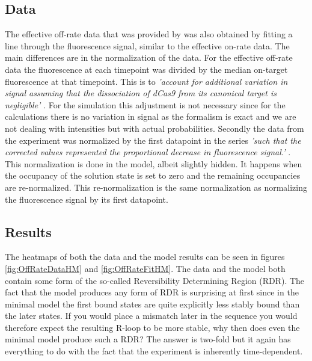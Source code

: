 \subsection{Data}
The effective off-rate data that was provided by \cite{PNAS} was also obtained by fitting a line through the fluorescence signal, similar to the effective on-rate data. The main differences are in the normalization of the data. For the effective off-rate data the fluorescence at each timepoint was divided by the median on-target fluorescence at that timepoint. This is to \textit{'account for additional variation in signal assuming that the dissociation of dCas9 from its canonical target is negligible'} \citep{PNAS}. For the simulation this adjustment is not necessary since for the calculations there is no variation in signal as the formalism is exact and we are not dealing with intensities but with actual probabilities. Secondly the data from the experiment was normalized by the first datapoint in the series \textit{'such that the corrected values represented the proportional decrease in fluorescence signal.'} \citep{PNAS}. This normalization is done in the model, albeit slightly hidden. It happens when the occupancy of the solution state is set to zero and the remaining occupancies are re-normalized. This re-normalization is the same normalization as normalizing the fluorescence signal by its first datapoint.


\subsection{Results}

The heatmaps of both the data and the model results can be seen in figures \ref{fig:OffRateDataHM} and \ref{fig:OffRateFitHM}. The data and the model both contain some form of the so-called Reversibility Determining Region (RDR). The fact that the model produces any form of RDR is surprising at first since in the minimal model the first bound states are quite explicitly less stably bound than the later states. If you would place a mismatch later in the sequence you would therefore expect the resulting R-loop to be more stable, why then does even the minimal model produce such a RDR? The answer is two-fold but it again has everything to do with the fact that the experiment is inherently time-dependent.

